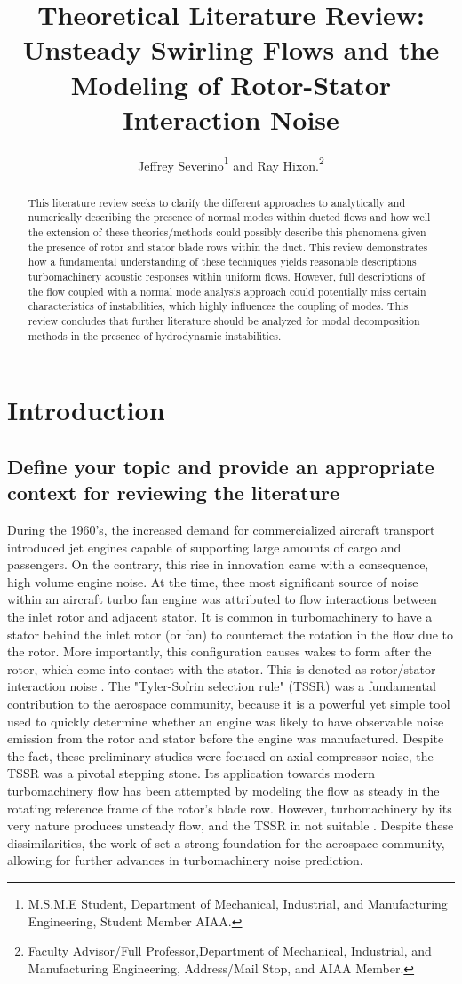 \documentclass[conf]{new-aiaa}
\title{Theoretical Literature Review: Unsteady Swirling Flows and the Modeling of Rotor-Stator Interaction Noise}
\author{Jeffrey Severino\footnote{M.S.M.E Student, Department of Mechanical, Industrial, and Manufacturing Engineering, Student Member AIAA.} and Ray Hixon.\footnote{Faculty Advisor/Full Professor,Department of Mechanical, Industrial, and Manufacturing Engineering, Address/Mail Stop, and AIAA Member.}}
\affil{University of Toledo, Toledo, OH, 43606}
\begin{document}
\maketitle

\begin{abstract}
This literature review seeks to clarify the different approaches to analytically and numerically describing the presence of normal modes within ducted flows and how well the extension of these theories/methods could possibly describe this phenomena given the presence of rotor and stator blade rows within the duct. This review demonstrates how a fundamental understanding of these techniques yields reasonable descriptions turbomachinery acoustic responses within uniform flows. However, full descriptions of the flow coupled with a normal mode analysis approach could potentially miss certain characteristics of instabilities, which highly influences the coupling of modes. This review concludes that further literature should be analyzed for modal decomposition methods in the presence of hydrodynamic instabilities. \end{abstract}

\section{Introduction}
\subsection{Define your topic and provide an appropriate context for reviewing the literature}
During the 1960's, the increased demand for commercialized aircraft transport introduced jet engines capable of supporting large amounts of cargo and passengers. On the contrary, this rise in innovation came with a consequence, high volume engine noise.  At the time, thee most significant source of noise within an aircraft turbo fan engine was attributed to flow interactions between the inlet rotor and adjacent stator. It is common in turbomachinery to have a stator behind the inlet rotor (or fan) to counteract the rotation in the flow due to the rotor. More importantly, this configuration causes wakes to form after the rotor, which come into contact with the stator. This is denoted as rotor/stator interaction noise \cite{Tyler1962}. The "Tyler-Sofrin selection rule" (TSSR) was a fundamental contribution to the aerospace community, because it is a powerful yet simple tool used to quickly determine whether an engine was likely to have observable noise emission from the rotor and stator before the engine was manufactured. Despite the fact, these preliminary studies were focused on axial compressor noise, the TSSR was a pivotal stepping stone. Its application towards modern turbomachinery flow has been attempted by modeling the flow as steady in the rotating reference frame of the rotor's blade row. However, turbomachinery by its very nature produces unsteady flow, and the TSSR in not suitable \cite{Holmes2011}. Despite these dissimilarities, the work of \cite{Tyler1962} set a strong foundation for the aerospace community, allowing for further advances in turbomachinery noise prediction.
\end{document}
